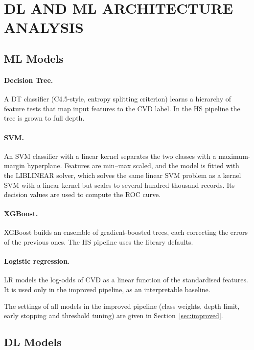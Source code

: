 \documentclass[11pt,a4paper]{article}
\begin{document}
\section{DL AND ML ARCHITECTURE ANALYSIS}
\label{sec:arch}

\subsection{ML Models}

\paragraph{Decision Tree.} A DT classifier (C4.5-style, entropy splitting
criterion) learns a hierarchy of feature tests that map input features to
the CVD label. In the HS pipeline the tree is grown to full depth.

\paragraph{SVM.} An SVM classifier with a linear kernel separates the two
classes with a maximum-margin hyperplane. Features are min--max scaled, and
the model is fitted with the LIBLINEAR solver, which solves the same linear
SVM problem as a kernel SVM with a linear kernel but scales to several
hundred thousand records. Its decision values are used to compute the ROC
curve.

\paragraph{XGBoost.} XGBoost builds an ensemble of gradient-boosted trees,
each correcting the errors of the previous ones. The HS pipeline uses the
library defaults.

\paragraph{Logistic regression.} LR models the log-odds of CVD as a linear
function of the standardised features. It is used only in the improved
pipeline, as an interpretable baseline.

The settings of all models in the improved pipeline (class weights, depth
limit, early stopping and threshold tuning) are given in
Section~\ref{sec:improved}.

\subsection{DL Models}
\end{document}

